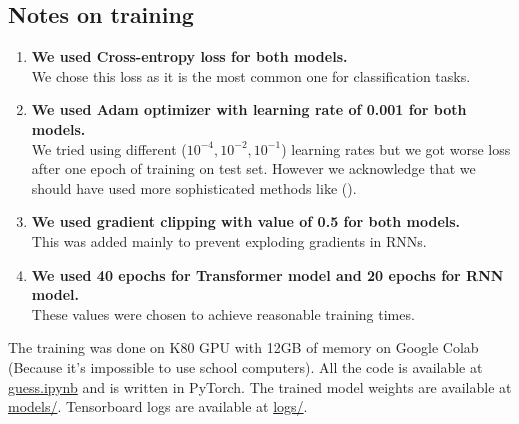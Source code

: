 \documentclass{article}
\begin{document}
    \subsection{Notes on training}
    \begin{enumerate}
        \item \textbf{We used Cross-entropy loss for both models.}\\
            We chose this loss as it is the most common one for classification tasks.
        \item \textbf{We used Adam optimizer with learning rate of 0.001 for both models.}\\
            We tried using different ($10^{-4}, 10^{-2}, 10^{-1}$) learning rates but we got worse loss after one epoch of training on test set.
            However we acknowledge that we should have used more sophisticated methods like (\cite{smithCyclicalLearningRates2017}).
        \item \textbf{We used gradient clipping with value of 0.5 for both models.}\\
            This was added mainly to prevent exploding gradients in RNNs.

        \item \textbf{We used 40 epochs for Transformer model and 20 epochs for RNN model.}\\
            These values were chosen to achieve reasonable training times.

    \end{enumerate}
    The training was done on K80 GPU with 12GB of memory on Google Colab (Because it's impossible to use school computers).
    All the code is available at \url{guess.ipynb} and is written in PyTorch.
    The trained model weights are available at \url{models/}.
    Tensorboard logs are available at \url{logs/}.
\end{document}
